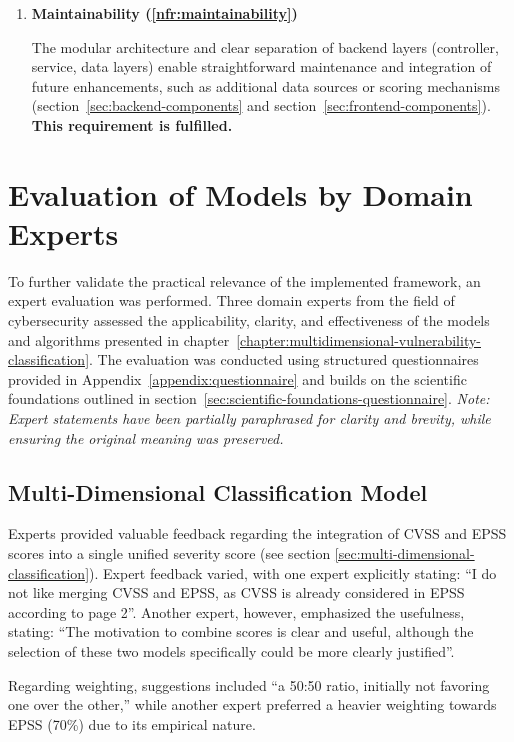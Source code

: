 \begin{enumerate}
    \item \textbf{Maintainability (\ref{nfr:maintainability})}
	      	            
    The modular architecture and clear separation of backend layers (controller, service, data layers) enable straightforward maintenance and integration of future enhancements, such as additional data sources or scoring mechanisms (section~\ref{sec:backend-components} and section~\ref{sec:frontend-components}). \textbf{This requirement is fulfilled.}
    
\end{enumerate}

\section{Evaluation of Models by Domain Experts}

To further validate the practical relevance of the implemented framework, an expert evaluation was performed. Three domain experts from the field of cybersecurity assessed the applicability, clarity, and effectiveness of the models and algorithms presented in chapter~\ref{chapter:multidimensional-vulnerability-classification}. The evaluation was conducted using structured questionnaires provided in Appendix~\ref{appendix:questionnaire} and builds on the scientific foundations outlined in section~\ref{sec:scientific-foundations-questionnaire}.
\textit{Note: Expert statements have been partially paraphrased for clarity and brevity, while ensuring the original meaning was preserved.}

\subsection{Multi-Dimensional Classification Model}

Experts provided valuable feedback regarding the integration of \ac{CVSS} and \ac{EPSS} scores into a single unified severity score (see section \ref{sec:multi-dimensional-classification}). Expert feedback varied, with one expert explicitly stating: \enquote{I do not like merging \ac{CVSS} and \ac{EPSS}, as \ac{CVSS} is already considered in \ac{EPSS} according to page 2}. Another expert, however, emphasized the usefulness, stating: \enquote{The motivation to combine scores is clear and useful, although the selection of these two models specifically could be more clearly justified}.

Regarding weighting, suggestions included \enquote{a 50:50 ratio, initially not favoring one over the other,} while another expert preferred a heavier weighting towards EPSS (70\%) due to its empirical nature.

